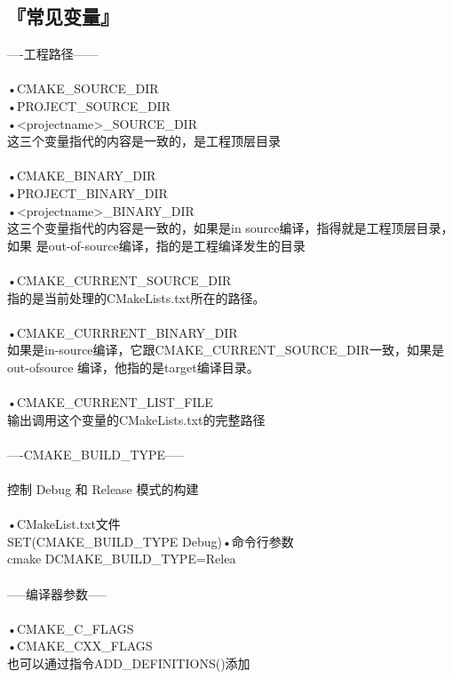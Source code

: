 \documentclass[11pt,a4paper,titlepage]{article}
\begin{document}
\subsection{\kai 『常见变量』}
----工程路径------\\
\\
•CMAKE\_SOURCE\_DIR\\
•PROJECT\_SOURCE\_DIR\\
•<projectname>\_SOURCE\_DIR\\
这三个变量指代的内容是一致的，是工程顶层目录\\
\\
•CMAKE\_BINARY\_DIR\\
•PROJECT\_BINARY\_DIR\\
•<projectname>\_BINARY\_DIR\\
这三个变量指代的内容是一致的，如果是in source编译，指得就是工程顶层目录，如果  是out-of-source编译，指的是工程编译发生的目录\\
\\
•CMAKE\_CURRENT\_SOURCE\_DIR\\
指的是当前处理的CMakeLists.txt所在的路径。\\
\\
•CMAKE\_CURRRENT\_BINARY\_DIR\\
如果是in-source编译，它跟CMAKE\_CURRENT\_SOURCE\_DIR一致，如果是out-ofsource  编译，他指的是target编译目录。\\
\\
•CMAKE\_CURRENT\_LIST\_FILE\\
输出调用这个变量的CMakeLists.txt的完整路径\\
\\
----CMAKE\_BUILD\_TYPE-----\\
\\
控制 Debug 和 Release 模式的构建\\
\\
•CMakeList.txt文件\\
SET(CMAKE\_BUILD\_TYPE Debug)•命令行参数\\
cmake DCMAKE\_BUILD\_TYPE=Relea \\
\\
-----编译器参数-----\\
\\
•CMAKE\_C\_FLAGS\\
•CMAKE\_CXX\_FLAGS\\
也可以通过指令ADD\_DEFINITIONS()添加\\
\\
\end{document}
